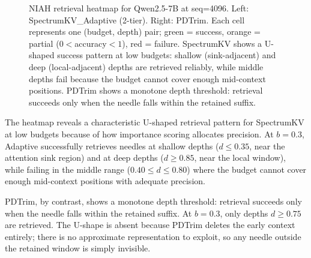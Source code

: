 \documentclass[11pt]{article}
\newcommand{\method}{SpectrumKV}
\newcommand{\budget}{b}
\theoremstyle{plain}
\theoremstyle{definition}
\begin{document}
\begin{figure}[t]
\caption{NIAH retrieval heatmap for Qwen2.5-7B at seq=4096.  Left: \method{}\_Adaptive (2-tier).  Right: PDTrim.  Each cell represents one (budget, depth) pair; green = success, orange = partial ($0 < $accuracy$ < 1$), red = failure.  \method{} shows a U-shaped success pattern at low budgets: shallow (sink-adjacent) and deep (local-adjacent) depths are retrieved reliably, while middle depths fail because the budget cannot cover enough mid-context positions.  PDTrim shows a monotone depth threshold: retrieval succeeds only when the needle falls within the retained suffix.}
\label{fig:niah-heatmap}
\end{figure}

The heatmap reveals a characteristic U-shaped retrieval pattern for \method{} at low budgets because of how importance scoring allocates precision.  At $\budget=0.3$, Adaptive successfully retrieves needles at shallow depths ($d \le 0.35$, near the attention sink region) and at deep depths ($d \ge 0.85$, near the local window), while failing in the middle range ($0.40 \le d \le 0.80$) where the budget cannot cover enough mid-context positions with adequate precision.

PDTrim, by contrast, shows a monotone depth threshold: retrieval succeeds only when the needle falls within the retained suffix.  At $\budget=0.3$, only depths $d \ge 0.75$ are retrieved.  The U-shape is absent because PDTrim deletes the early context entirely; there is no approximate representation to exploit, so any needle outside the retained window is simply invisible.
\end{document}

